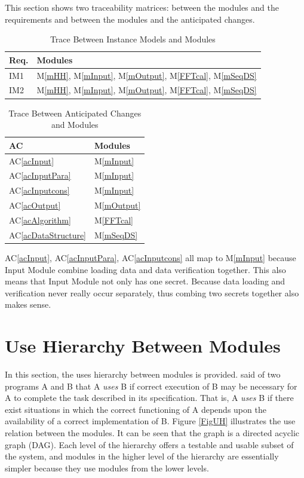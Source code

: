 \documentclass[12pt, titlepage]{article}
\newcommand{\acref}[1]{AC\ref{#1}}
\newcommand{\mref}[1]{M\ref{#1}}
\begin{document}
This section shows two traceability matrices: between the modules and the
requirements and between the modules and the anticipated changes.

\begin{table}[H]
\centering
\begin{tabular}{p{} p{}}
\toprule
\textbf{Req.} & \textbf{Modules}\\
\midrule
IM1 &\mref{mHH}, \mref{mInput}, \mref{mOutput},  \mref{FFTcal},  \mref{mSeqDS}\\
IM2 & \mref{mHH}, \mref{mInput}, \mref{mOutput}, \mref{FFTcal}, \mref{mSeqDS}\\
\bottomrule
\end{tabular}
\caption{Trace Between Instance Models and Modules}
\label{TblRT}
\end{table}

\begin{table}[H]
\centering
\begin{tabular}{p{} p{}}
\toprule
\textbf{AC} & \textbf{Modules}\\
\midrule
\acref{acInput} & \mref{mInput}\\
\acref{acInputPara} & \mref{mInput}\\
\acref{acInputcons} & \mref{mInput}\\
\acref{acOutput} & \mref{mOutput}\\
\acref{acAlgorithm} & \mref{FFTcal}\\
\acref{acDataStructure} & \mref{mSeqDS}\\
\bottomrule
\end{tabular}
\caption{Trace Between Anticipated Changes and Modules}
\label{TblACT}
\end{table}
\acref{acInput}, \acref{acInputPara}, \acref{acInputcons} all map to \mref{mInput} because Input Module combine loading data and data verification together.
This also means that Input Module not only has one secret. Because data loading and verification never really occur separately, thus combing two secrets together
also makes sense.

\section{Use Hierarchy Between Modules} \label{SecUse}

In this section, the uses hierarchy between modules is
provided. \citet{Parnas1978} said of two programs A and B that A {\em uses} B if
correct execution of B may be necessary for A to complete the task described in
its specification. That is, A {\em uses} B if there exist situations in which
the correct functioning of A depends upon the availability of a correct
implementation of B.  Figure \ref{FigUH} illustrates the use relation between
the modules. It can be seen that the graph is a directed acyclic graph
(DAG). Each level of the hierarchy offers a testable and usable subset of the
system, and modules in the higher level of the hierarchy are essentially simpler
because they use modules from the lower levels.
\end{document}
